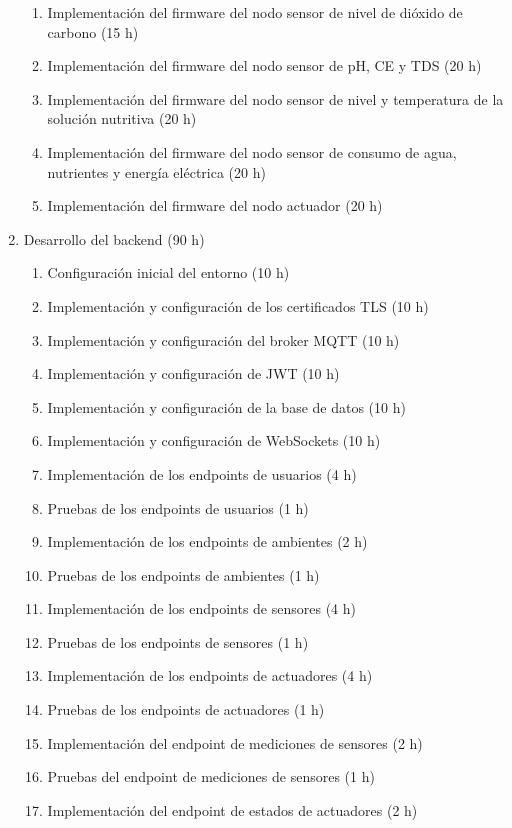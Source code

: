 \begin{enumerate}
\begin{enumerate}
		      \item Implementación del firmware del nodo sensor de nivel de dióxido de carbono (15 h)
		      \item Implementación del firmware del nodo sensor de pH, CE y TDS (20 h)
		      \item Implementación del firmware del nodo sensor de nivel y temperatura de la solución nutritiva (20 h)
		      \item Implementación del firmware del nodo sensor de consumo de agua, nutrientes y energía eléctrica (20 h)
		      \item Implementación del firmware del nodo actuador (20 h)
	      \end{enumerate}
	\item Desarrollo del backend (90 h)
	      \begin{enumerate}
		      \item Configuración inicial del entorno (10 h)
			  \item Implementación y configuración de los certificados TLS (10 h)
			  \item Implementación y configuración del broker MQTT (10 h)
		      \item Implementación y configuración de JWT (10 h)
		      \item Implementación y configuración de la base de datos (10 h)
		      \item Implementación y configuración de WebSockets (10 h)
		      \item Implementación de los endpoints de usuarios (4 h)
		      \item Pruebas de los endpoints de usuarios (1 h)
		      \item Implementación de los endpoints de ambientes (2 h)
		      \item Pruebas de los endpoints de ambientes (1 h)
		      \item Implementación de los endpoints de sensores (4 h)
		      \item Pruebas de los endpoints de sensores (1 h)
		      \item Implementación de los endpoints de actuadores (4 h)
		      \item Pruebas de los endpoints de actuadores (1 h)
		      \item Implementación del endpoint de mediciones de sensores (2 h)
		      \item Pruebas del endpoint de mediciones de sensores (1 h)
		      \item Implementación del endpoint de estados de actuadores (2 h)

\end{enumerate}
\end{enumerate}
